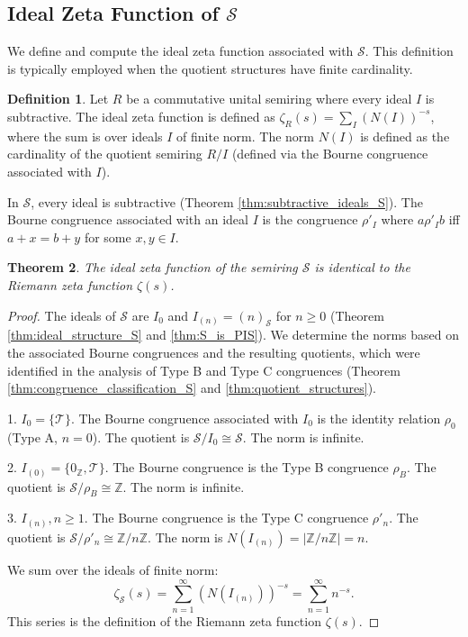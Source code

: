 \documentclass[11pt, a4paper]{article}
\theoremstyle{plain}
\newtheorem{theorem}{Theorem}[section]
\theoremstyle{definition}
\newtheorem{definition}[theorem]{Definition}
\numberwithin{equation}{section}
\newcommand{\Z}{\mathbb{Z}}
\newcommand{\Tobj}{\mathcal{T}} %
\newcommand{\SemiringS}{\mathcal{S}}
\begin{document}
\subsection{Ideal Zeta Function of $\SemiringS$}

We define and compute the ideal zeta function associated with $\SemiringS$. This definition is typically employed when the quotient structures have finite cardinality.

\begin{definition}
Let $R$ be a commutative unital semiring where every ideal $I$ is subtractive. The ideal zeta function is defined as $\zeta_R(s) = \sum_{I} (N(I))^{-s}$, where the sum is over ideals $I$ of finite norm. The norm $N(I)$ is defined as the cardinality of the quotient semiring $R/I$ (defined via the Bourne congruence associated with $I$).
\end{definition}

In $\SemiringS$, every ideal is subtractive (Theorem \ref{thm:subtractive_ideals_S}). The Bourne congruence associated with an ideal $I$ is the congruence $\rho'_I$ where $a \rho'_I b$ iff $a+x=b+y$ for some $x, y \in I$.

\begin{theorem}\label{thm:zeta_S}
The ideal zeta function of the semiring $\SemiringS$ is identical to the Riemann zeta function $\zeta(s)$.
\end{theorem}
\begin{proof}
The ideals of $\SemiringS$ are $I_0$ and $I_{(n)}=(n)_{\SemiringS}$ for $n\ge 0$ (Theorem \ref{thm:ideal_structure_S} and \ref{thm:S_is_PIS}). We determine the norms based on the associated Bourne congruences and the resulting quotients, which were identified in the analysis of Type B and Type C congruences (Theorem \ref{thm:congruence_classification_S} and \ref{thm:quotient_structures}).

1. $I_0=\{\Tobj\}$. The Bourne congruence associated with $I_0$ is the identity relation $\rho_0$ (Type A, $n=0$). The quotient is $\SemiringS/I_0 \cong \SemiringS$. The norm is infinite.

2. $I_{(0)}=\{0_{\Z}, \Tobj\}$. The Bourne congruence is the Type B congruence $\rho_B$. The quotient is $\SemiringS/\rho_B \cong \Z$. The norm is infinite.

3. $I_{(n)}, n\ge 1$. The Bourne congruence is the Type C congruence $\rho'_n$. The quotient is $\SemiringS/\rho'_n \cong \Z/n\Z$. The norm is $N(I_{(n)})=|\Z/n\Z|=n$.

We sum over the ideals of finite norm:
\begin{equation}
    \zeta_{\SemiringS}(s) = \sum_{n=1}^{\infty} (N(I_{(n)}))^{-s} = \sum_{n=1}^{\infty} n^{-s}.
\end{equation}
This series is the definition of the Riemann zeta function $\zeta(s)$.
\end{proof}
\end{document}
